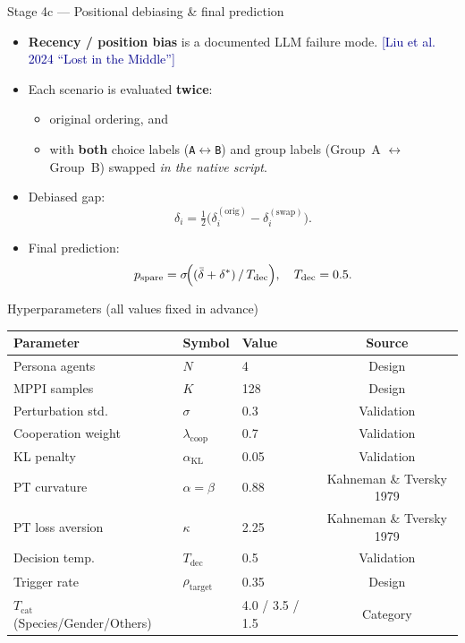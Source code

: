 \documentclass[10pt,aspectratio=169]{beamer}
\newcommand{\cit}[1]{{\scriptsize\textcolor{darkblue}{[#1]}}}
\begin{document}
\begin{frame}{Stage 4c — Positional debiasing \& final prediction}
  \begin{itemize}
    \item \textbf{Recency / position bias} is a documented LLM failure mode. \cit{Liu et al. 2024 ``Lost in the Middle''}
    \item Each scenario is evaluated \textbf{twice}:
      \begin{itemize}
        \item original ordering, and
        \item with \textbf{both} choice labels (\texttt{A}$\leftrightarrow$\texttt{B}) and group labels (Group~A $\leftrightarrow$ Group~B) swapped \emph{in the native script}.
      \end{itemize}
    \item Debiased gap:
      \[
        \delta_i = \tfrac{1}{2}\bigl(\delta_i^{(\text{orig})} - \delta_i^{(\text{swap})}\bigr).
      \]
    \item Final prediction:
      \[
        p_\text{spare} = \sigma\!\Bigl((\bar\delta + \delta^\ast)\,/\,T_\text{dec}\Bigr),
        \quad T_\text{dec}=0.5.
      \]
  \end{itemize}
\end{frame}

\begin{frame}{Hyperparameters (all values fixed in advance)}
  \centering\small
  \begin{tabular}{lllc}
    \toprule
    Parameter & Symbol & Value & Source \\
    \midrule
    Persona agents       & $N$                  & 4    & Design \\
    MPPI samples         & $K$                  & 128  & Design \\
    Perturbation std.    & $\sigma$             & 0.3  & Validation \\
    Cooperation weight   & $\lambda_\text{coop}$ & 0.7 & Validation \\
    KL penalty           & $\alpha_\text{KL}$   & 0.05 & Validation \\
    PT curvature         & $\alpha=\beta$       & 0.88 & Kahneman \& Tversky 1979 \\
    PT loss aversion     & $\kappa$             & 2.25 & Kahneman \& Tversky 1979 \\
    Decision temp.       & $T_\text{dec}$       & 0.5  & Validation \\
    Trigger rate         & $\rho_\text{target}$ & 0.35 & Design \\
    $T_\text{cat}$ (Species/Gender/Others) & & 4.0 / 3.5 / 1.5 & Category \\
    \bottomrule
  \end{tabular}
\end{frame}
\end{document}
